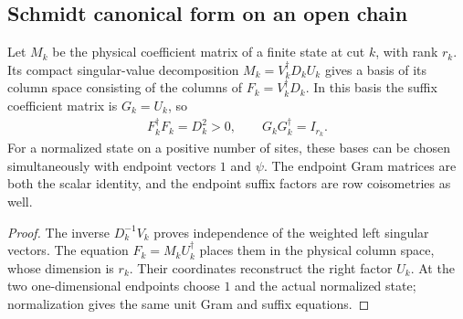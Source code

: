 \subsection{Schmidt canonical form on an open chain}
\label{sec:obc_schmidt_canonical}

\begin{lemma}
    \label{lem:obc_weighted_schmidt_cut_bases}
    \leanok
    Let $M_k$ be the physical coefficient matrix of a finite state at cut
    $k$, with rank $r_k$. Its compact singular-value decomposition
    $M_k=V_k^\dagger D_kU_k$ gives a basis of its column space consisting
    of the columns of $F_k=V_k^\dagger D_k$. In this basis the suffix
    coefficient matrix is $G_k=U_k$, so
    \begin{align}
        F_k^\dagger F_k=D_k^2>0,\qquad G_kG_k^\dagger=I_{r_k}.
    \end{align}
    For a normalized state on a positive number of sites, these bases
    can be chosen simultaneously with endpoint vectors $1$ and $\psi$.
    The endpoint Gram matrices are both the scalar identity, and the
    endpoint suffix factors are row coisometries as well.
\end{lemma}
\begin{proof}
    \leanok
    The inverse $D_k^{-1}V_k$ proves independence of the weighted left
    singular vectors. The equation $F_k=M_kU_k^\dagger$ places them
    in the physical column space, whose dimension is $r_k$. Their
    coordinates reconstruct the right factor $U_k$. At the two
    one-dimensional endpoints choose $1$ and the actual normalized
    state; normalization gives the same unit Gram and suffix equations.
\end{proof}


